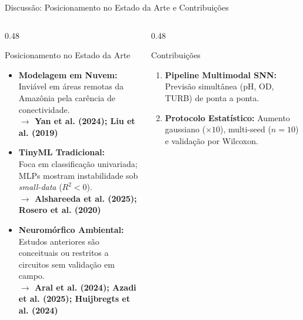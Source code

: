 \documentclass[aspectratio=169,10pt]{beamer}
\begin{document}
\begin{frame}{Discussão: Posicionamento no Estado da Arte e Contribuições}
  \begin{columns}[T,onlytextwidth]
    \begin{column}{0.48\linewidth}
      \begin{block}{Posicionamento no Estado da Arte}
        \footnotesize
        \begin{itemize}
          \item \textbf{Modelagem em Nuvem:}\\
          {\scriptsize Inviável em áreas remotas da Amazônia pela carência de conectividade.\\
          \color{CBAPurple!90!black}\textbf{\tiny$\to$ Yan et al. (2024); Liu et al. (2019)}}
          \vspace{0.08cm}
          \item \textbf{TinyML Tradicional:}\\
          {\scriptsize Foca em classificação univariada; MLPs mostram instabilidade sob \textit{small-data} ($R^2 < 0$).\\
          \color{CBAPurple!90!black}\textbf{\tiny$\to$ Alshareeda et al. (2025); Rosero et al. (2020)}}
          \vspace{0.08cm}
          \item \textbf{Neuromórfico Ambiental:}\\
          {\scriptsize Estudos anteriores são conceituais ou restritos a circuitos sem validação em campo.\\
          \color{CBAPurple!90!black}\textbf{\tiny$\to$ Aral et al. (2024); Azadi et al. (2025); Huijbregts et al. (2024)}}
        \end{itemize}
      \end{block}
    \end{column}
    \hfill
    \begin{column}{0.48\linewidth}
      \begin{exampleblock}{Contribuições}
        \footnotesize
        \begin{enumerate}
          \item \textbf{Pipeline Multimodal SNN:} Previsão simultânea (pH, OD, TURB) de ponta a ponta.
          \vspace{0.08cm}
          \item \textbf{Protocolo Estatístico:} Aumento gaussiano ($\times 10$), multi-seed ($n=10$) e validação por Wilcoxon.

\end{enumerate}
\end{exampleblock}
\end{column}
\end{columns}
\end{frame}
\end{document}
